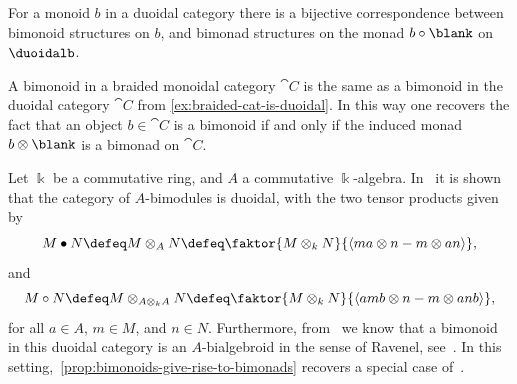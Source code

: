 \begin{proposition}\label{prop:bimonoids-give-rise-to-bimonads}
  For a monoid \(b\) in a duoidal category \duoidal{}
  there is a bijective correspondence between
  bimonoid structures on \(b\),
  and bimonad structures on the monad \(b \circ \blank\) on \(\duoidalb\).
\end{proposition}

\begin{example}\label{ex:bialgebras-gives-rise-to-bimonads}
  A bimonoid in a braided monoidal category \(\cat{C}\)
  is the same as a bimonoid in the duoidal category \(\cat{C}\) from \cref{ex:braided-cat-is-duoidal}.
  In this way one recovers the fact that an object \(b \in \cat{C}\) is a bimonoid
  if and only if the induced monad \(b \otimes \blank\) is a bimonad on \(\cat{C}\).
\end{example}

\begin{example}
  Let \(\Bbbk\) be a commutative ring,
  and \(A\) a commutative \(\Bbbk\)\hyp{}algebra.
  In~\cite[Example~6.18]{Aguiar2010} it is shown that the category of \(A\)\hyp{}bimodules is duoidal,
  with the two tensor products given by
  \[
    M \bullet N \defeq M \otimes_A N \defeq \faktor{M \otimes_{k} N}{\langle ma \otimes n - m \otimes an \rangle},
  \]
  and
  \[
    M \circ N \defeq M \otimes_{A \otimes_{k} A} N \defeq \faktor{M \otimes_k N}{\langle amb \otimes n - m \otimes anb \rangle},
  \]
  for all \(a \in A\), \(m \in M\), and \(n \in N\).
  Furthermore, from~\cite[Example~6.44]{Aguiar2010} we know that a bimonoid in this duoidal category is an
  \(A\)\hyp{}bialgebroid in the sense of Ravenel, see~\cite[Definition~A1.1.1]{ravenel86:compl}.
  In this setting,~\cref{prop:bimonoids-give-rise-to-bimonads} recovers a special case
  of~\cite[Theorems~5.1 and~5.4]{szlachanyi03:eilen-moore}.
\end{example}

